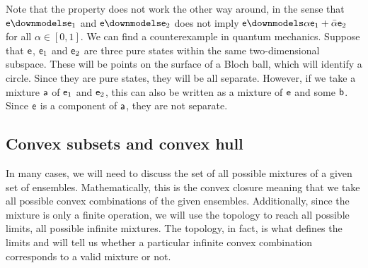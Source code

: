 \begin{mathSection}
\begin{remark}
	Note that the property does not work the other way around, in the sense that $\ens \separate \ens_1$ and $\ens \separate \ens_2$ does not imply $\ens \separate \alpha \ens_1 + \bar{\alpha} \ens_2$ for all $\alpha \in [0, 1]$. We can find a counterexample in quantum mechanics. Suppose that $\ens$, $\ens_1$ and $\ens_2$ are three pure states within the same two-dimensional subspace. These will be points on the surface of a Bloch ball, which will identify a circle. Since they are pure states, they will be all separate. However, if we take a mixture $\ens[a]$ of $\ens_1$ and $\ens_2$, this can also be written as a mixture of $\ens$ and some $\ens[b]$. Since $\ens$ is a component of $\ens[a]$, they are not separate.
\end{remark}
\end{mathSection}

\subsection{Convex subsets and convex hull}

In many cases, we will need to discuss the set of all possible mixtures of a given set of ensembles. Mathematically, this is the convex closure meaning that we take all possible convex combinations of the given ensembles. Additionally, since the mixture is only a finite operation, we will use the topology to reach all possible limits, all possible infinite mixtures. The topology, in fact, is what defines the limits and will tell us whether a particular infinite convex combination corresponds to a valid mixture or not.

